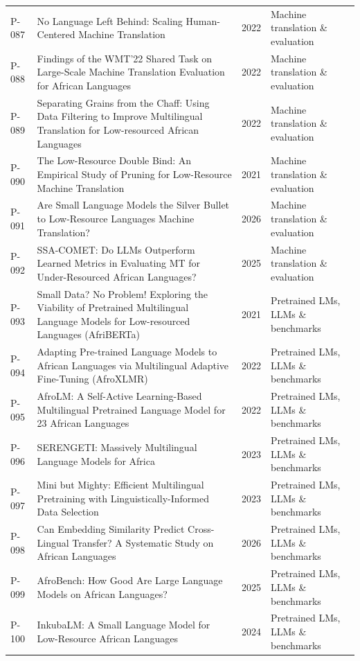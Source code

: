 \begin{longtable}{@{}p{} p{} p{} p{}@{}}
P-087 & No Language Left Behind: Scaling Human-Centered Machine Translation & 2022 & Machine translation \& evaluation \\
P-088 & Findings of the WMT'22 Shared Task on Large-Scale Machine Translation Evaluation for African Languages & 2022 & Machine translation \& evaluation \\
P-089 & Separating Grains from the Chaff: Using Data Filtering to Improve Multilingual Translation for Low-resourced African Languages & 2022 & Machine translation \& evaluation \\
P-090 & The Low-Resource Double Bind: An Empirical Study of Pruning for Low-Resource Machine Translation & 2021 & Machine translation \& evaluation \\
P-091 & Are Small Language Models the Silver Bullet to Low-Resource Languages Machine Translation? & 2026 & Machine translation \& evaluation \\
P-092 & SSA-COMET: Do LLMs Outperform Learned Metrics in Evaluating MT for Under-Resourced African Languages? & 2025 & Machine translation \& evaluation \\
P-093 & Small Data? No Problem! Exploring the Viability of Pretrained Multilingual Language Models for Low-resourced Languages (AfriBERTa) & 2021 & Pretrained LMs, LLMs \& benchmarks \\
P-094 & Adapting Pre-trained Language Models to African Languages via Multilingual Adaptive Fine-Tuning (AfroXLMR) & 2022 & Pretrained LMs, LLMs \& benchmarks \\
P-095 & AfroLM: A Self-Active Learning-Based Multilingual Pretrained Language Model for 23 African Languages & 2022 & Pretrained LMs, LLMs \& benchmarks \\
P-096 & SERENGETI: Massively Multilingual Language Models for Africa & 2023 & Pretrained LMs, LLMs \& benchmarks \\
P-097 & Mini but Mighty: Efficient Multilingual Pretraining with Linguistically-Informed Data Selection & 2023 & Pretrained LMs, LLMs \& benchmarks \\
P-098 & Can Embedding Similarity Predict Cross-Lingual Transfer? A Systematic Study on African Languages & 2026 & Pretrained LMs, LLMs \& benchmarks \\
P-099 & AfroBench: How Good Are Large Language Models on African Languages? & 2025 & Pretrained LMs, LLMs \& benchmarks \\
P-100 & InkubaLM: A Small Language Model for Low-Resource African Languages & 2024 & Pretrained LMs, LLMs \& benchmarks \\

\end{longtable}
